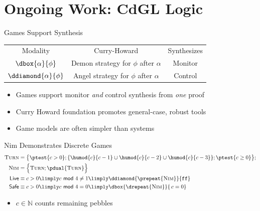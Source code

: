 \documentclass[slidestop,aspectratio=169]{beamer}
\newcommand{\CdGL}{CdGL\xspace}
\newcommand{\turn}{\textsc{Turn}}
\newcommand{\nim}{\textsc{Nim}}
\newcommand{\kwmod}{\textsf{mod}}
\newcommand{\emod}[2]{#1~\kwmod~#2}
\newcommand{\bff}{\texttt{ff}}
\theoremstyle{plain}
\theoremstyle{definition}
\theoremstyle{remark}
\begin{document}
\section{Ongoing Work: \CdGL Logic}
\begin{frame}[t]{Games Support Synthesis}
  \begin{tabular}{ccc}
    Modality                  & Curry-Howard & Synthesizes \\
    $\dbox{\alpha}{\phi}$     & Demon strategy for $\phi$ after $\alpha$ & Monitor \\
    $\ddiamond{\alpha}{\phi}$ & Angel strategy for $\phi$ after $\alpha$ & Control
  \end{tabular}\pause
  \begin{itemize}
  \item Games support monitor \emph{and} control synthesis from \emph{one} proof
  \item Curry Howard foundation promotes general-case, robust tools
  \item Game models are often simpler than systems
  \end{itemize}
\end{frame}

\begin{frame}[t]{Nim Demonstrates Discrete Games}
  \begin{align*}
\turn &= \big\{\ptest{c>0};
                 \{\humod{c}{c-1} \cup \humod{c}{c-2} \cup \humod{c}{c-3}\};
                \ptest{c \geq 0}\big\};\\
\nim &=\Big\{\turn; \pdual{\turn}\Big\}\\
\textsf{Live} &\equiv c > 0 \limply \emod{c}{4} \neq 1 \limply \ddiamond{\prepeat{\nim}}{\bff}\\
\textsf{Safe} &\equiv c > 0 \limply \emod{c}{4} = 0 \limply \dbox{\drepeat{\nim}}{\,c = 0}
  \end{align*}
  \begin{itemize}
  \item $c \in \mathbb{N}$ counts remaining pebbles
  \end{itemize}
\end{frame}
\end{document}
